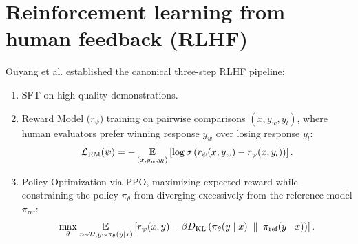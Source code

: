 \documentclass[../../main.tex]{subfiles}
\begin{document}
\section{Reinforcement learning from human feedback (RLHF)}
Ouyang et al. \citep{ouyang2022} established the canonical three-step RLHF pipeline:
\begin{enumerate}
    \item SFT on high-quality demonstrations.
    \item Reward Model ($r_\psi$) training on pairwise comparisons $(x, y_w, y_l)$, where human evaluators prefer winning response $y_w$ over losing response $y_l$:
    \begin{equation}
    \mathcal{L}_{\text{RM}}(\psi) = -\operatorname*{\mathbb{E}}_{(x, y_w, y_l)} \left[ \log \sigma\left( r_\psi(x, y_w) - r_\psi(x, y_l) \right) \right].
    \end{equation}
    \item Policy Optimization via PPO, maximizing expected reward while constraining the policy $\pi_\theta$ from diverging excessively from the reference model $\pi_{\text{ref}}$:
    \begin{equation}
    \label{eq:rlhf_objective}
    \max_{\theta} \operatorname*{\mathbb{E}}_{x \sim \mathcal{D}, y \sim \pi_\theta(y \mid x)} \left[ r_\psi(x, y) - \beta D_{\mathrm{KL}}\left(\pi_\theta(y \mid x) \;\parallel\; \pi_{\text{ref}}(y \mid x)\right) \right].
    \end{equation}
\end{enumerate}
\end{document}
